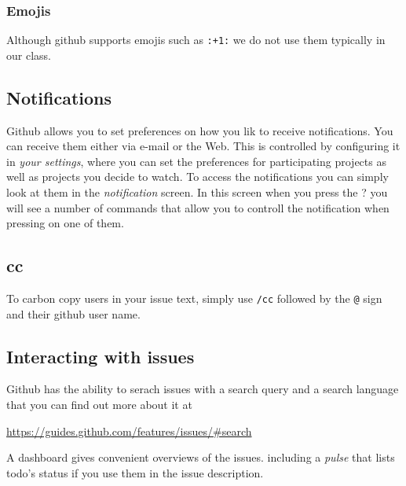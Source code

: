 \subsubsection{Emojis}

Although github supports emojis such as \verb|:+1:| we do not use them
typically in our class.


\subsection{Notifications}

Github allows you to set preferences on how you lik to receive
notifications. You can receive them either via e-mail or the Web.
This is controlled by configuring it in {\em your settings}, where
you can set the preferences for participating projects as well as
projects you decide to watch. To access the notifications you can
simply look at them in the {\em notification} screen. In this screen
when you press the ? you will see a number of commands that allow you
to controll the notification when pressing on one of them.

\subsection{cc}

To carbon copy users in your issue text, simply use \verb|/cc|
followed by the \verb|@| sign and their github user name.


\subsection{Interacting with issues}

Github has the ability to serach issues with a search query and a
search language that you can find out more about it at 

\url{https://guides.github.com/features/issues/#search}

A dashboard gives convenient overviews of the issues. including a {\em
  pulse} that lists todo's status if you use them in the issue
description.





